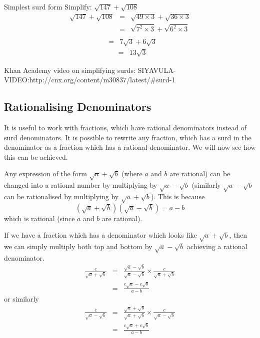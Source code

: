 \begin{wex}{Simplest surd form}
{Simplify: $\sqrt{147} + \sqrt{108}$}{
\begin{eqnarray*}
\sqrt{147} + \sqrt{108} &=& \sqrt{49\times 3} + \sqrt{36\times 3}\\
&=& \sqrt{7^{2}\times 3} + \sqrt{6^{2}\times 3}\\
\end{eqnarray*}
\begin{eqnarray*}
&=& 7\sqrt{3} + 6\sqrt{3}
\end{eqnarray*}
\begin{eqnarray*}
&=& 13\sqrt{3}
\end{eqnarray*}
}
\end{wex}

Khan Academy video on simplifying surds: SIYAVULA-VIDEO:http://cnx.org/content/m30837/latest/#surd-1

\subsection{Rationalising Denominators}
It is useful to work with fractions, which have rational denominators instead of surd denominators. It is possible to rewrite any fraction, which has a surd in the denominator as a fraction which has a rational denominator. We will now see how this can be achieved.

Any expression of the form $\sqrt{a}+\sqrt{b}$ (where $a$ and $b$ are rational)
can be changed into a rational number by multiplying by $\sqrt{a}-\sqrt{b}$
(similarly $\sqrt{a}-\sqrt{b}$ can be rationalised by multiplying by
$\sqrt{a}+\sqrt{b}$). This is because
\begin{equation}
\label{eq:mn:s:rat}
(\sqrt{a}+\sqrt{b})(\sqrt{a}-\sqrt{b})=a-b
\end{equation}
which is rational (since $a$ and $b$ are rational).

If we have a fraction which has a denominator which looks like
$\sqrt{a}+\sqrt{b}$, then we can simply multiply both top and bottom by
$\sqrt{a}-\sqrt{b}$ achieving a rational denominator.
\begin{eqnarray}
\label{eq:mn:s:rat:frac1}
\frac{c}{\sqrt a+\sqrt b}&=&\frac{\sqrt{a}-\sqrt{b}}{\sqrt{a}-\sqrt{b}}
\times\frac{c}{\sqrt a+\sqrt b}\\\nonumber
&=&\frac{c\sqrt{a}-c\sqrt{b}}{a-b}
\end{eqnarray}
or similarly
\begin{eqnarray}
\label{eq:mn:s:rat:frac2}
\frac{c}{\sqrt a-\sqrt b}&=&\frac{\sqrt{a}+\sqrt{b}}{\sqrt{a}+\sqrt{b}}
\times\frac{c}{\sqrt a-\sqrt b}\\\nonumber
&=&\frac{c\sqrt{a}+c\sqrt{b}}{a-b}
\end{eqnarray}

